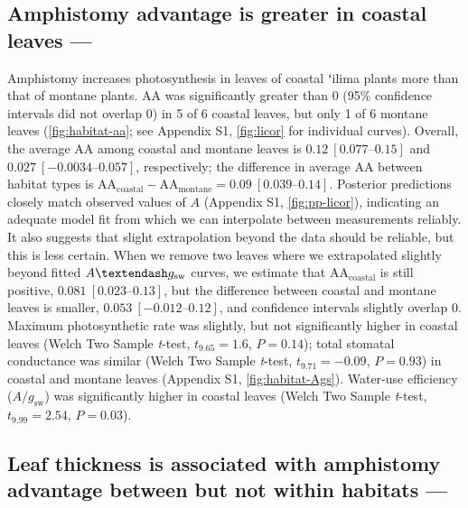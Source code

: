 \documentclass[
  letterpaper,
  DIV=11,
  numbers=noendperiod]{scrartcl}
\begin{document}
\hypertarget{amphistomy-advantage-is-greater-in-coastal-leaves}{%
\subsection{Amphistomy advantage is greater in coastal leaves
---}\label{amphistomy-advantage-is-greater-in-coastal-leaves}}

Amphistomy increases photosynthesis in leaves of coastal ʻilima plants
more than that of montane plants. \(\mathrm{AA}\) was significantly
greater than 0 (95\% confidence intervals did not overlap 0) in 5 of 6
coastal leaves, but only 1 of 6 montane leaves
(\autoref{fig:habitat-aa}; see Appendix S1, \autoref{fig:licor} for
individual curves). Overall, the average \(\mathrm{AA}\) among coastal
and montane leaves is \(0.12~[\numrange{0.077}{0.15}]\) and
\(0.027~[\numrange{-0.0034}{0.057}]\), respectively; the difference in
average \(\mathrm{AA}\) between habitat types is
\(\mathrm{AA}_\text{coastal} - \mathrm{AA}_\text{montane} = 0.09~[\numrange{0.039}{0.14}]\).
Posterior predictions closely match observed values of \(A\) (Appendix
S1, \autoref{fig:pp-licor}), indicating an adequate model fit from which
we can interpolate between measurements reliably. It also suggests that
slight extrapolation beyond the data should be reliable, but this is
less certain. When we remove two leaves where we extrapolated slightly
beyond fitted \(A \textendash g_\mathrm{sw}\) curves, we estimate that
\(\mathrm{AA}_\text{coastal}\) is still positive,
\(0.081~[\numrange{0.023}{0.13}]\), but the difference between coastal
and montane leaves is smaller, \(0.053~[\numrange{-0.012}{0.12}]\), and
confidence intervals slightly overlap 0. Maximum photosynthetic rate was
slightly, but not significantly higher in coastal leaves (Welch Two
Sample \emph{t}-test, \(t_{9.65} = 1.6\), \(P = 0.14\)); total stomatal
conductance was similar (Welch Two Sample \emph{t}-test,
\(t_{9.71} = -0.09\), \(P = 0.93\)) in coastal and montane leaves
(Appendix S1, \autoref{fig:habitat-Ags}). Water-use efficiency
(\(A / g_\mathrm{sw}\)) was significantly higher in coastal leaves
(Welch Two Sample \emph{t}-test, \(t_{9.99} = 2.54\), \(P = 0.03\)).

\hypertarget{leaf-thickness-is-associated-with-amphistomy-advantage-between-but-not-within-habitats}{%
\subsection{Leaf thickness is associated with amphistomy advantage
between but not within habitats
---}\label{leaf-thickness-is-associated-with-amphistomy-advantage-between-but-not-within-habitats}}
\end{document}
